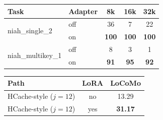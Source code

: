 \begin{table}[!htbp]
\centering
\small
\begin{minipage}[t]{\textwidth}
\centering
\setlength{\tabcolsep}{5pt}
\begin{tabular}{@{}llccc@{}}
\toprule
\textbf{Task} & \textbf{Adapter} & \textbf{8k} & \textbf{16k} & \textbf{32k} \\
\midrule
\multirow{2}{*}{niah\_single\_2}
  & off & 36 & 7 & 22 \\
  & on  & \textbf{100} & \textbf{100} & \textbf{100} \\
\midrule
\multirow{2}{*}{niah\_multikey\_1}
  & off & 8 & 3 & 1 \\
  & on  & \textbf{91} & \textbf{95} & \textbf{92} \\
\bottomrule
\end{tabular}
\label{tab:adapter}
\end{minipage}

\vspace{6pt}
\begin{minipage}[t]{\textwidth}
\centering
\setlength{\tabcolsep}{6pt}
\begin{tabular}{@{}lcc@{}}
\toprule
\textbf{Path} & \textbf{LoRA} & \textbf{LoCoMo} \\
\midrule
HCache-style ($j{=}12$) & no  & 13.29 \\
HCache-style ($j{=}12$) & yes & \textbf{31.17} \\
\bottomrule
\end{tabular}
\label{tab:hcache-lora}
\end{minipage}
\end{table}

